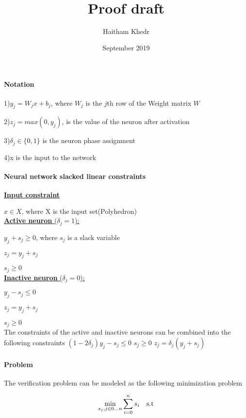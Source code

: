 \documentclass{article}
\title{Proof draft}
\author{Haitham Khedr }
\date{September 2019}
\begin{document}
\maketitle

\paragraph{Notation}\noindent

1)$y_j =W_jx + b_j$, where $W_j$ is the $j$th row of the Weight matrix $W$

2)$z_j = max(0,y_j)$, is the value of the neuron after activation

3)$\delta_j\in{\{0,1\}}$ is the neuron phase assignment

4)x is the input to the network

\paragraph{Neural network slacked linear constraints\\} \noindent

\underline{\textbf{Input constraint}}

$x\in X$, where X is the input set(Polyhedron)\\

\underline{\textbf{Active neuron} (\emph{$\delta_j = 1$}):}

$y_j + s_j \geq 0$, where $ s_j$ is a slack variable

$z_j = y_j + s_j $

$s_j \geq 0$\\

\underline{\textbf{Inactive neuron} (\emph{$\delta_j = 0$}):}

$y_j - s_j \leq 0$

$z_j = y_j + s_j $

$s_j \geq 0$\\

The constraints of the active and inactive neurons can be combined into the following constraints
$(1-2\delta_j)y_j - s_j \leq 0$
$s_j \geq 0$
$z_j = \delta_j(y_j +s_j)$
\newpage
\paragraph{Problem\\} 

The verification problem can be modeled as the following minimization problem

$$\min\limits_{s_j,j\in{0\dots n}}\displaystyle\sum_{i=0}^{n}s_i\text{\quad s.t}$$
\end{document}
